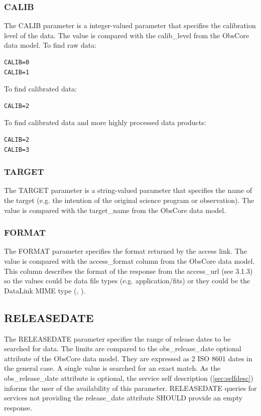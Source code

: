 \documentclass[11pt,a4paper]{ivoa}
\begin{document}
\subsubsection{CALIB}
The CALIB parameter is a integer-valued parameter that specifies the calibration level of the data. The value is compared with the calib\_level from the ObsCore data model. To find raw data:

\begin{lstlisting}
CALIB=0
CALIB=1
\end{lstlisting}
To find calibrated data:

\begin{lstlisting}
CALIB=2
\end{lstlisting}
To find calibrated data and more highly processed data products:

\begin{lstlisting}
CALIB=2
CALIB=3
\end{lstlisting}

\subsubsection{TARGET}
The TARGET parameter is a string-valued parameter that specifies the name of the target (e.g. the intention of the original science program or observation). The value is compared with the target\_name from the ObsCore data model.

\subsubsection{FORMAT}
The FORMAT parameter specifies the  format returned by  the access  link.  The value is compared with the access\_format column from the ObsCore data model. This column describes the format of the response from the access\_url (see 3.1.3) so the values could be data file types (e.g. application/fits) or they could be the DataLink  MIME type (\cite{std:DataLink}, \cite{std:TSV}).  

\subsection{RELEASEDATE}
The RELEASEDATE parameter specifies the range of release dates to be searched for data. 
The limits are compared to the obs\_release\_date optional attribute of the ObsCore data model. 
They are expressed as 2 ISO 8601 dates in the general case. A single value is searched for an exact match.
As the obs\_release\_date attribute is optional, the service self description (\ref{sec:selfdesc})  informs the user of the availability of this parameter.
RELEASEDATE queries for services not providing the release\_date attribute SHOULD provide an empty response.
\end{document}
